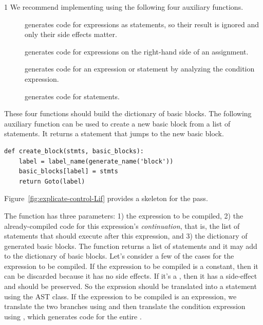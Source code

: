 \documentclass[7x10]{TimesAPriori_MIT}%
\def\pythonEd{1}
\def\edition{1}
\begin{document}
{\if\edition\pythonEd
%
We recommend implementing  using the
following four auxiliary functions.
\begin{description}
\item[] generates code for expressions as
  statements, so their result is ignored and only their side effects
  matter.
\item[] generates code for expressions
  on the right-hand side of an assignment.
\item[] generates code for an 
  expression or statement by analyzing the condition expression.
\item[] generates code for statements.
\end{description}
These four functions should build the dictionary of basic blocks. The
following auxiliary function can be used to create a new basic block
from a list of statements. It returns a  statement that
jumps to the new basic block.
\begin{center}
\begin{minipage}{\textwidth}
\begin{lstlisting}
def create_block(stmts, basic_blocks):
    label = label_name(generate_name('block'))
    basic_blocks[label] = stmts
    return Goto(label)
\end{lstlisting}
\end{minipage}
\end{center}
Figure~\ref{fig:explicate-control-Lif} provides a skeleton for the
 pass.

The  function has three parameters: 1) the
expression to be compiled, 2) the already-compiled code for this
expression's \emph{continuation}, that is, the list of statements that
should execute after this expression, and 3) the dictionary of
generated basic blocks. The  function returns
a list of \LangCIf{} statements and it may add to the dictionary of
basic blocks.
%
Let's consider a few of the cases for the expression to be compiled.
If the expression to be compiled is a constant, then it can be
discarded because it has no side effects. If it's a \CREAD{}, then it
has a side-effect and should be preserved. So the exprssion should be
translated into a statement using the  AST class. If the
expression to be compiled is an  expression, we translate the
two branches using  and then translate the
condition expression using , which generates
code for the entire .

}
\end{document}
